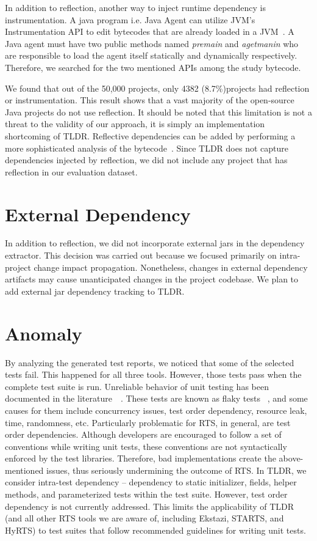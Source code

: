 In addition to reflection, another way to inject runtime dependency is instrumentation. A java program i.e. Java Agent can utilize JVM's Instrumentation API to edit bytecodes that are already loaded in a JVM~\cite{binder2007advanced}. A Java agent must have two public methods named \textit{premain} and \textit{agetmanin} who are responsible to load the agent itself statically and dynamically respectively. Therefore, we searched for the two mentioned APIs among the study bytecode. 

We found that out of the 50,000 projects, only 4382 (8.7\%)projects had reflection or instrumentation. This result shows that a vast majority of the open-source Java projects do not use reflection. It should be noted that this limitation is not a threat to the validity of our approach, it is simply an implementation shortcoming of TLDR. Reflective dependencies can be added by performing a more sophisticated analysis of the bytecode~\cite{b17}. Since TLDR does not capture dependencies injected by reflection, we did not include any project that has reflection in our evaluation dataset. 


\section{External Dependency}

In addition to reflection, we did not incorporate external jars in the dependency extractor. This decision was carried out because we focused primarily on intra-project change impact propagation. Nonetheless, changes in external dependency artifacts may cause unanticipated changes in the project codebase. We plan to add external jar dependency tracking to TLDR.

\section{Anomaly}

By analyzing the generated test reports, we noticed that some of the selected tests fail. This happened for all three tools. However, those tests pass when the complete test suite is run. Unreliable behavior of unit testing has been documented in the literature~\cite{b20,b22}~\cite{palomba2017does}. These tests are known as flaky tests ~\cite{b18}, and some causes for them include concurrency issues, test order dependency, resource leak, time, randomness, etc. Particularly problematic for RTS, in general, are test order dependencies. Although developers are encouraged to follow a set of conventions while writing unit tests, these conventions are not syntactically enforced by the test libraries. Therefore, bad implementations create the above-mentioned issues, thus seriously undermining the outcome of RTS. In TLDR, we consider intra-test dependency -- dependency to static initializer, fields, helper methods, and parameterized tests within the test suite. However, test order dependency is not currently addressed. This limits the applicability of TLDR (and all other RTS tools we are aware of, including Ekstazi, STARTS, and HyRTS) to test suites that follow recommended guidelines for writing unit tests.

